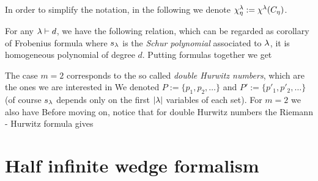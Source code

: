\documentclass[10pt]{beamer}
\begin{document}
\begin{frame}

In order to simplify the notation, in the following we denote $\chi^\lambda_\eta:=\chi^\lambda(C_\eta)$. 

For any $\lambda\vdash d$, we have the following relation, which can be regarded as corollary of Frobenius formula
where $s_\lambda$ is the \emph{Schur polynomial} associated to $\lambda$, it is homogeneous polynomial of degree $d$. Putting formulas together we get

\end{frame}

\begin{frame}

The case $m=2$ corresponds to the so called \emph{double Hurwitz numbers}, which are the ones we are interested in
We denoted $P:=\{p_1,p_2,\ldots\}$ and $P':=\{p'_1,p'_2,\ldots\}$ (of course $s_\lambda$ depends only on the first $|\lambda|$ variables of each set). For $m=2$ we also have
Before moving on, notice that for double Hurwitz numbers the Riemann - Hurwitz formula gives

\end{frame}

\section{Half infinite wedge formalism}
\end{document}
